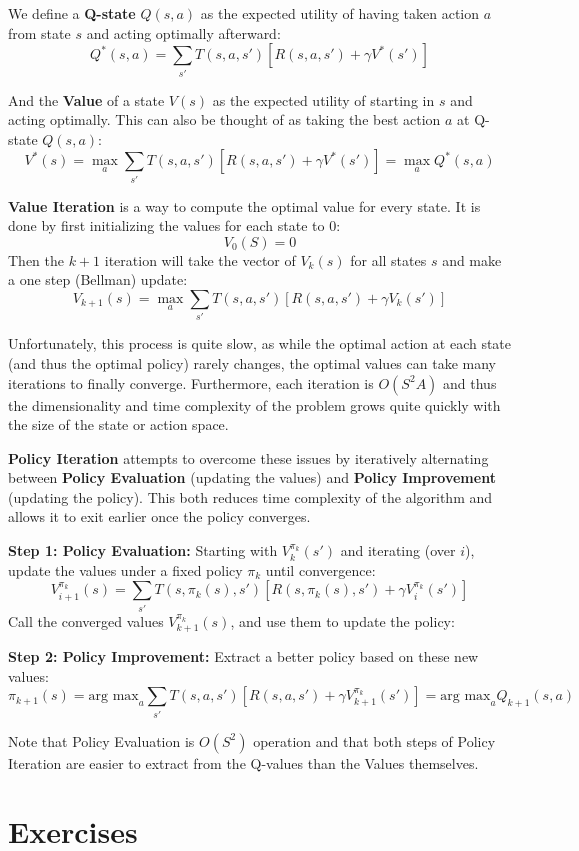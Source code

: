 \documentclass[11pt]{article}
\begin{document}
We define a \textbf{Q-state} $Q(s, a)$ as the expected utility of having taken action $a$ from state $s$ and acting optimally afterward:
$$Q^*(s,a) = \sum_{s'}T(s, a, s')[R(s, a, s') + \gamma V^*(s')]$$

And the \textbf{Value} of a state $V(s)$ as the expected utility of starting in $s$ and acting optimally. This can also be thought of as taking the best action $a$ at Q-state $Q(s,a)$:
$$V^*(s) = \max_a \sum_{s'}T(s, a, s')[R(s, a, s') + \gamma V^*(s')] = \max_a Q^*(s, a)$$

\textbf{Value Iteration} is a way to compute the optimal value for every state. It is done by first initializing the values for each state to 0:
$$V_0(S) = 0$$
Then the $k+1$ iteration will take the vector of $V_k(s)$ for all states $s$ and make a one step (Bellman) update:
$$V_{k+1}(s) = \max_a \sum_{s'} T(s, a, s') [R(s,a,s') + \gamma V_k(s')]$$

Unfortunately, this process is quite slow, as while the optimal action at each state (and thus the optimal policy) rarely changes, the optimal values can take many iterations to finally converge. Furthermore, each iteration is $O(S^2A)$ and thus the dimensionality and time complexity of the problem grows quite quickly with the size of the state or action space.

\textbf{Policy Iteration} attempts to overcome these issues by iteratively alternating between \textbf{Policy Evaluation} (updating the values) and \textbf{Policy Improvement} (updating the policy). This both reduces time complexity of the algorithm and allows it to exit earlier once the policy converges.

\textbf{Step 1: Policy Evaluation:} Starting with $V_k^{\pi_k}(s')$ and iterating (over $i$), update the values under a fixed policy $\pi_k$ until convergence:
$$V^{\pi_k}_{i+1}(s) = \sum_{s'} T(s, \pi_k(s), s') [R(s,\pi_k(s),s') + \gamma V_i^{\pi_k}(s')]$$
Call the converged values $V^{\pi_k}_{k+1}(s)$, and use them to update the policy:

\textbf{Step 2: Policy Improvement:} Extract a better policy based on these new values:
$$\pi_{k+1}(s) = \text{arg max}_a \sum_{s'} T(s, a, s') [R(s,a,s')+ \gamma V^{\pi_k}_{k+1}(s')] = \text{arg max}_a Q_{k+1}(s,a)$$

Note that Policy Evaluation is $O(S^2)$ operation and that both steps of Policy Iteration are easier to extract from the Q-values than the Values themselves.

\section*{Exercises}
\end{document}

